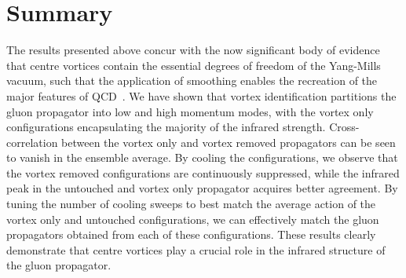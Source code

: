 \section{Summary}
The results presented above concur with the now significant body of evidence that centre vortices contain the essential degrees of freedom of the Yang-Mills vacuum, such that the application of smoothing enables the recreation of the major features of QCD~\cite{Bertle:2001xd,Trewartha:2015ida,Trewartha:2015nna,Trewartha:2017ive,DelDebbio:1998luz}. We have shown that vortex identification partitions the gluon propagator into low and high momentum modes, with the vortex only configurations encapsulating the majority of the infrared strength. Cross-correlation between the vortex only and vortex removed propagators can be seen to vanish in the ensemble average. By cooling the configurations, we observe that the vortex removed configurations are continuously suppressed, while the infrared peak in the untouched and vortex only propagator acquires better agreement. By tuning the number of cooling sweeps to best match the average action of the vortex only and untouched configurations, we can effectively match the gluon propagators obtained from each of these configurations. These results clearly demonstrate that centre vortices play a crucial role in the infrared structure of the gluon propagator.
%
